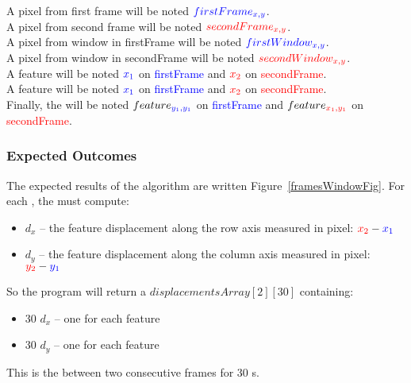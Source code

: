 A pixel from first frame will be noted $\textcolor{blue}{firstFrame_{x,y}}$.\\
A pixel from second frame will be noted $\textcolor{red}{secondFrame_{x,y}}$.\\
A pixel from window in firstFrame will be noted $\textcolor{blue}{firstWindow_{x,y}}$.\\
A pixel from window in secondFrame will be noted $\textcolor{red}{secondWindow_{x,y}}$.\\
A feature  will be noted $\textcolor{blue}{x_{1}}$ on \textcolor{blue}{firstFrame} and $\textcolor{red}{x_{2}}$ on \textcolor{red}{secondFrame}.\\
A feature  will be noted $\textcolor{blue}{x_{1}}$ on \textcolor{blue}{firstFrame} and $\textcolor{red}{x_{2}}$ on \textcolor{red}{secondFrame}.\\
Finally, the  will be noted $feature_{\textcolor{blue}{y_{1},y_{1}}}$ on \textcolor{blue}{firstFrame} and $feature_{\textcolor{red}{x_{1},y_{1}}}$ on \textcolor{red}{secondFrame}.

\subsubsection{Expected Outcomes}

The expected results of the \flow{} algorithm are written Figure~\ref{framesWindowFig}. For each \feat{}, the \vc{} must compute:
\begin{itemize}
	\item \textbf{$d_{x}$} -- the feature displacement along the row axis measured in pixel: $\textcolor{red}{x_{2}}-\textcolor{blue}{x_{1}}$
	\item \textbf{$d_{y}$} -- the feature displacement along the column axis measured in pixel: $\textcolor{red}{y_{2}}-\textcolor{blue}{y_{1}}$
\end{itemize}

So the \flow{} program will return a  $displacementsArray[2][30]$ containing:
\begin{itemize}
	\item 30 $d_{x}$  -- one for each feature
	\item 30 $d_{y}$  -- one for each feature
\end{itemize}

This is the \flow{} between two consecutive frames for 30 \feat{}s.
\newpage

